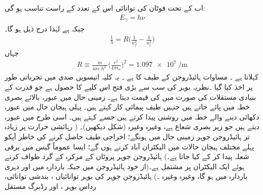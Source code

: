 اب   کے تحت  فوٹان  کی توانائی اس کے تعدد کے راست تناسب ہو گی:
\begin{align}
E_{\gamma}=h\nu
\end{align}
جبکہ        ہے لہٰذا درج ذیل ہو گا۔
\begin{align}\label{مساوات_تین_ابعادی_رڈبرگ_کلیہ}
\frac{1}{\lambda}=R\big(\frac{1}{n^{2}_{f}}-\frac{1}{n^{2}_{i}}\big)
\end{align}
جہاں 
\begin{align}
R\equiv \frac{m}{4\pi{c}\hslash^{3}}\big(\frac{e^{2}}{4\pi\epsilon_{o}}\big)^{2}=\SI{1.097e7}{\per\meter}
\end{align}
 کہلاتا ہے ۔ مساوات  ہائیڈروجن کے طیف کا    ہے ۔ یہ کلیہ انیسویں  صدی میں تجرباتی طور پر اخذ کیا گیا ۔نظریہ بوہر  کی سب سے بڑی فتح  اس کلیے کا حصول ہے جو قدرت کے بنیادی مستقلات  کی صورت میں   کی قیمت دیتا ہے۔ زمینی حال    میں عبور،   بالائے بصری خطہ میں پائے  جاتے  ہیں  جنہیں    طیف پیمائی کار   کہتے ہیں۔ پہلی  ہیجان  حال  
میں عبور،     دکھائی دینے والے خطہ میں  روشنی پیدا  کرتے  ہیں  جسے   کہتے ہیں۔  اسی طرح   
میں  عبور،   دیتے ہیں  جو  زیر  بصری شعاع ہے، وغیرہ وغیرہ  (شکل  دیکھیں)۔  (  رہائشی حرارت پر زیادہ تر  ہائیڈروجن  جوہر زمینی حال میں ہونگے؛ اخراجی طیف حاصل کرنے کی خاطر آپکو پہلے مختلف  ہیجان  حالات میں الیکٹران  آباد کرنے ہوں گے؛  ایسا عموماً گیس میں برقی شعلہ   پیدا کر کے کیا جاتا ہے۔)
ہائیڈروجن جوہر  پروٹان  کے مرکزہ کے گرد طواف کرتے ہوئے  ایک  الیکٹران  پر مشتمل  ہے۔(از  خود ہائیڈروجن  میں      جبکہ    باردارہ  میں   اور دہری باردارہ    میں    ہو گا،  وغیرہ وغیرہ ۔)   ہائیڈروجن  جوہر کی بوہر  توانائیاں  ،  بندشی  توانائی،   رداس بوہر  ،  اور رڈبرگ  مستقل  

